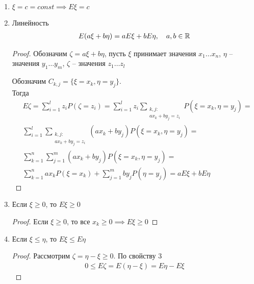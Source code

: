 \begin{enumerate}
  \item $\xi = c = const \implies E\xi = c$
  \item 
    Линейность
    \begin{align*}
      E(a\xi + b\eta) = a E \xi + b E \eta, \quad a, b \in \mathbb{R}
    \end{align*}

    \begin{proof}
      Обозначим $\zeta = a\xi + b\eta$, пусть $\xi$ принимает значения $x_1 \ldots x_n$, 
      $\eta$ -- значения $y_1 \ldots y_m$, $\zeta$ -- значения $z_1 \ldots z_l$

      Обозначим $C_{k, j} = \{ \xi = x_k, \eta = y_j \}$.\\
      Тогда 
      \begin{align*}
        &E\zeta = \sum_{i = 1}^l z_i P(\zeta = z_i) = \sum_{i = 1}^l z_i 
        \sum_{\substack{k,j:\\ a x_k + b y_j = z_i}} P(\xi = x_k, \eta = y_j) =\\
        &\sum_{i = 1}^l \sum_{\substack{k,j:\\ a x_k + b y_j = z_i}} (a x_k + b y_j) 
        P(\xi = x_k, \eta = y_j) =\\
        &\sum_{k = 1}^n \sum_{j = 1}^m (a x_k + b y_j) P(\xi = x_k, \eta = y_j) =\\
        &\sum_{k = 1}^n a x_k P(\xi = x_k) + \sum_{j = 1}^m b y_j P(\eta = y_j) = a E \xi + b E \eta
      \end{align*}

    \end{proof}

  \item Если $\xi \geq 0$, то $E \xi \geq 0$
    \begin{proof}
      Если $\xi \geq 0$, то все $x_k \geq 0 \implies E \xi \geq 0$
    \end{proof}

  \item Если $\xi \leq \eta$, то $E \xi \leq E \eta$
    \begin{proof}
      Рассмотрим $\zeta = \eta - \xi \geq 0$. По свойству 3\\
        \begin{align*}
          0 \leq E \zeta = E (\eta - \xi) = E \eta - E \xi
        \end{align*}
    \end{proof}
\end{enumerate}


